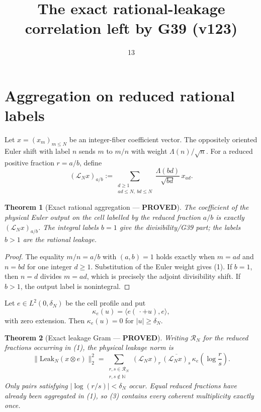 \documentclass[11pt]{article}
\title{The exact rational-leakage correlation left by G39 (v123)}
\date{13}
\newcommand{\PROVED}{\textcolor{green!40!black}{\textbf{PROVED}}}
\newtheorem{theorem}{Theorem}
\begin{document}
\maketitle

\section{Aggregation on reduced rational labels}

Let $x=(x_m)_{m\le N}$ be an integer-fiber coefficient vector.  The
oppositely oriented Euler shift with label $n$ sends $m$ to $m/n$ with
weight $\Lambda(n)/\sqrt n$.  For a reduced positive fraction $r=a/b$,
define
\begin{equation}
 (\mathcal L_Nx)_{a/b}
 :=\sum_{\substack{d\ge1\\ad\le N,\ bd\le N}}
       \frac{\Lambda(bd)}{\sqrt{bd}}\,x_{ad}.                 \tag{1}
\end{equation}

\begin{theorem}[Exact rational aggregation --- \PROVED]
The coefficient of the physical Euler output on the cell labelled by the
reduced fraction $a/b$ is exactly $(\mathcal L_Nx)_{a/b}$.  The integral
labels $b=1$ give the divisibility/G39 part; the labels $b>1$ are the
rational leakage.
\end{theorem}

\begin{proof}
The equality $m/n=a/b$ with $(a,b)=1$ holds exactly when
$m=ad$ and $n=bd$ for one integer $d\ge1$.  Substitution of the Euler
weight gives (1).  If $b=1$, then $n=d$ divides $m=ad$, which is precisely
the adjoint divisibility shift.  If $b>1$, the output label is nonintegral.
\end{proof}

Let $e\in L^2(0,\delta_N)$ be the cell profile and put
\begin{equation}
 \kappa_e(u)=\langle e(\,\cdot+u),e\rangle,                  \tag{2}
\end{equation}
with zero extension.  Then $\kappa_e(u)=0$ for $|u|\ge\delta_N$.

\begin{theorem}[Exact leakage Gram --- \PROVED]
Writing $\mathscr R_N$ for the reduced fractions occurring in (1), the
physical leakage norm is
\begin{equation}
 \boxed{
 \|\mathrm{Leak}_N(x\otimes e)\|_2^2
 =\sum_{\substack{r,s\in\mathscr R_N\\r,s\notin\mathbb N}}
  (\mathcal L_Nx)_r\,
  \overline{(\mathcal L_Nx)_s}\,
  \kappa_e\!\left(\log\frac rs\right).}                     \tag{3}
\end{equation}
Only pairs satisfying
$|\log(r/s)|<\delta_N$ occur.  Equal reduced fractions have already been
aggregated in (1), so (3) contains every coherent multiplicity exactly
once.
\end{theorem}
\end{document}
